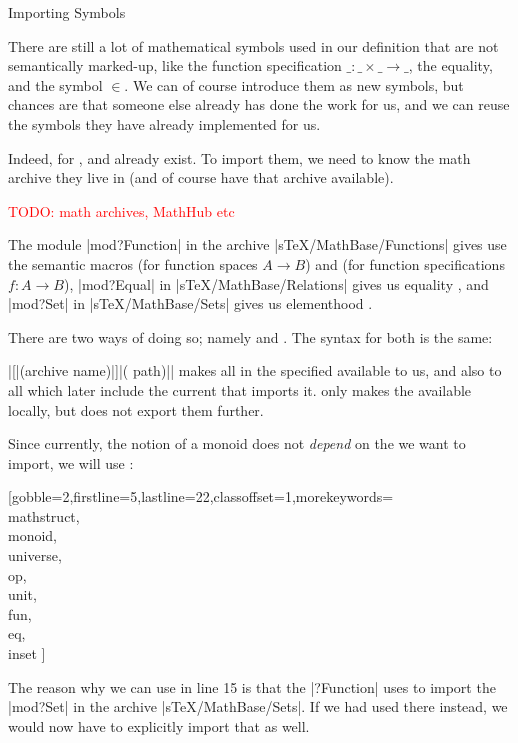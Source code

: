 \documentclass[lang={en,de}]{stex}
\begin{document}
  \begin{sfragment}{Importing Symbols}



    There are still a lot of mathematical symbols used in our definition
    that are not semantically marked-up, like the function
    specification
    $\_:\_\times\_\rightarrow\_$, the equality, and the
    symbol $\in$. We can of course introduce them as new symbols,
    but chances are that someone else already has done the work
    for us, and we can reuse the symbols they have already implemented
    for us.

    Indeed,  for ,  and
     already exist. To import them, we need to know
    the math archive they live in (and of course have that
    archive available).

    \textcolor{red}{TODO: math archives, MathHub etc}


    The module |mod?Function| in the archive |sTeX/MathBase/Functions|
    gives use the semantic macros  (for function spaces
    $A\to B$) and  (for function specifications $f:A\to B$),
    |mod?Equal| in |sTeX/MathBase/Relations| gives us equality
    ,
    and |mod?Set| in |sTeX/MathBase/Sets| gives us elementhood 
    .

    There are two ways of doing so; namely  and
    . The syntax for both is the same:

    |[|(archive name)|]{|( path)|}|
    makes all  in the specified  available to us,
    and also to all  which later include the 
    current  that imports it.
     only makes the  available locally, but
    does not export them further.
    
    Since currently, the notion of a monoid does not \emph{depend}
    on the  we want to import, we will use :

    [gobble=2,firstline=5,lastline=22,classoffset=1,morekeywords={
    \\mathstruct,\\monoid,\\universe,\\op,\\unit,\\fun,\\eq,\\inset
    }]

    The reason why we can use  in line 15 is that the 
    |?Function| uses  to import the 
    |mod?Set| in the archive |sTeX/MathBase/Sets|. If we had used
     there instead, we would now have to explicitly
    import that  as well.
  \end{sfragment}
\end{document}
